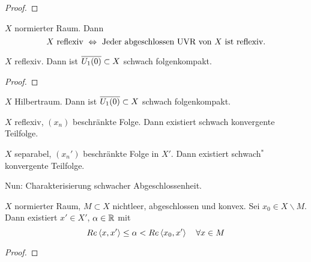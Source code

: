 \documentclass[ngerman]{report}
\begin{document}

	\begin{proof}
		\todor
	\end{proof}

	\begin{lemma}
		$X$ normierter Raum. Dann 
			$$ X \text{ reflexiv } \overset{}{\Leftrightarrow} \text{ Jeder abgeschlossen UVR von } X \text{ ist reflexiv}.$$
	\end{lemma}

	\begin{hinweise}
	\end{hinweise}

	\begin{thm}
		$X$ reflexiv. Dann ist $\overline{U_{1}(0)} \subset X$ schwach folgenkompakt.
	\end{thm}
	
	\begin{proof}
		\todor	
	\end{proof}

	\begin{cor}
		$X$ Hilbertraum. Dann ist $\overline{U_{1}(0)} \subset X$ schwach folgenkompakt.
	\end{cor}

	\begin{cor}
		$X$ reflexiv, $(x_n)$ beschränkte Folge. Dann existiert schwach konvergente Teilfolge.
	\end{cor}

	\begin{cor}
		$X$ separabel, $(x_n')$ beschränkte Folge in $X'$. Dann existiert schwach$^*$ konvergente Teilfolge.
	\end{cor}

	Nun: Charakterisierung schwacher Abgeschlossenheit.
	
	\begin{thm}[Trennungssatz]
		$X$ normierter Raum, $M \subset X$ nichtleer, abgeschlossen und konvex. Sei $x_0 \in X\backslash M$. Dann existiert $x' \in X'$, $\alpha\in \mathbb{R}$ mit
			$$Re\left \langle x,x' \right \rangle \leq \alpha < Re\left \langle x_0, x' \right \rangle \quad \forall x\in M$$
	\end{thm}
	\begin{proof}
		\todor	
	\end{proof}
\end{document}
